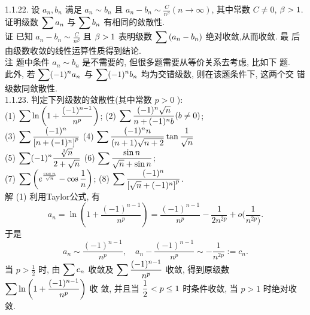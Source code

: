 \documentclass[a4paper,11pt,UTF8]{article}
\begin{document}
1.1.22. 设 $a_n, b_n$ 满足 $a_n \sim b_n$ 且 $a_n-b_n \sim \frac{C}{n^\beta}(n \rightarrow \infty)$, 其中常数 $C \neq 0$, $\displaystyle \displaystyle \displaystyle \beta>1$. 证明级数 $\displaystyle \displaystyle \displaystyle \sum a_n$ 与 $\displaystyle \displaystyle \displaystyle \sum b_n$ 有相同的敛散性.\\
证 已知 $a_n-b_n \sim \frac{C}{n^\beta}$ 且 $\displaystyle \displaystyle \displaystyle \beta>1$ 表明级数 $\displaystyle \displaystyle \displaystyle \sum\left(a_n-b_n\right)$ 绝对收敛,从而收敛. 最 后由级数收敛的线性运算性质得到结论.\\
注 题中条件 $a_n \sim b_n$ 是不需要的, 但很多题需要从等价关系去考虑, 比如下 题.\\
此外, 若 $\displaystyle \displaystyle \displaystyle \sum(-1)^n a_n$ 与 $\displaystyle \displaystyle \displaystyle \sum(-1)^n b_n$ 均为交错级数, 则在该题条件下, 这两个交 错级数同敛散性.\\
1.1.23. 判定下列级数的敛散性(其中常数 $p>0$ ):\\
(1) $\displaystyle \displaystyle \displaystyle \sum \ln \left(1+\frac{(-1)^{n-1}}{n^p}\right)$;
(2) $\displaystyle \displaystyle \displaystyle \sum \frac{(-1)^n \sqrt{n}}{n+(-1)^n b}(b \neq 0)$;\\
(3) $\displaystyle \displaystyle \displaystyle \sum \frac{(-1)^n}{\left[n+(-1)^n\right]^p}$
(4) $\displaystyle \displaystyle \displaystyle \sum \frac{(-1)^n n}{(n+1) \sqrt{n+2}} \tan \frac{1}{\sqrt{n}}$\\
(5) $\displaystyle \displaystyle \displaystyle \sum(-1)^n \frac{\sqrt[3]{n}}{2+\sqrt{n}}$
(6) $\displaystyle \displaystyle \displaystyle \sum \frac{\sin n}{\sqrt{n}+\sin n}$;\\
(7) $\displaystyle \displaystyle \displaystyle \sum\left(e^{\frac{\cos n}{\sqrt{n}}}-\cos \frac{1}{n}\right)$;
(8) $\displaystyle \displaystyle \displaystyle \sum \frac{(-1)^n}{\left[\sqrt{n}+(-1)^n\right]^p}$.\\
解 (1) 利用Taylor公式, 有
$$
a_n=\ln \left(1+\frac{(-1)^{n-1}}{n^p}\right)=\frac{(-1)^{n-1}}{n^p}-\frac{1}{2 n^{2 p}}+o (\frac{1}{n^{2 p})} .
$$
于是
$$
a_n \sim \frac{(-1)^{n-1}}{n^p}, \quad a_n-\frac{(-1)^{n-1}}{n^p} \sim-\frac{1}{n^{2 p}}:=c_n .
$$
当 $p>\frac{1}{2}$ 时, 由 $\displaystyle \displaystyle \displaystyle \sum c_n$ 收敛及 $\displaystyle \displaystyle \displaystyle \sum \frac{(-1)^{n-1}}{n^p}$ 收敛, 得到原级数 $\displaystyle \displaystyle \displaystyle \sum \ln \left(1+\frac{(-1)^{n-1}}{n^p}\right)$ 收 敛, 并且当 $\displaystyle \displaystyle \displaystyle \frac{1}{2}<p \leq 1$ 时条件收敛, 当 $p>1$ 时绝对收敛.\\
\end{document}

